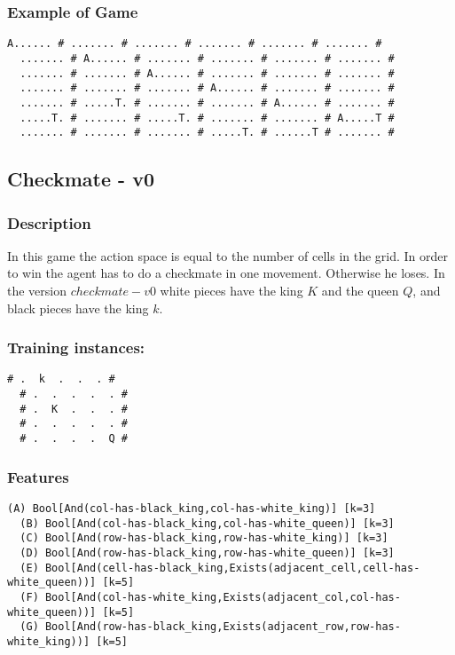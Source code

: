 \documentclass[a4paper]{article}
\begin{document}
\subsubsection{Example of Game}
\begin{Verbatim}[fontsize=\footnotesize]
  A...... # ....... # ....... # ....... # ....... # ....... #
  ....... # A...... # ....... # ....... # ....... # ....... #
  ....... # ....... # A...... # ....... # ....... # ....... #
  ....... # ....... # ....... # A...... # ....... # ....... #
  ....... # .....T. # ....... # ....... # A...... # ....... #
  .....T. # ....... # .....T. # ....... # ....... # A.....T #
  ....... # ....... # ....... # .....T. # ......T # ....... #
\end{Verbatim}

\subsection{Checkmate - v0}
\subsubsection{Description}
In this game the action space is equal to the number of cells in the grid. In order to win the agent has to do a checkmate in one movement. Otherwise he loses. In the version $checkmate-v0$ white pieces have the king $K$ and the queen $Q$, and black pieces have the king $k$.

\subsubsection{Training instances:}
\begin{Verbatim}[fontsize=\footnotesize]
  # .  k  .  .  . #
  # .  .  .  .  . #
  # .  K  .  .  . #
  # .  .  .  .  . #
  # .  .  .  .  Q #
\end{Verbatim}


\subsubsection{Features}
\begin{Verbatim}[fontsize=\footnotesize]
  (A) Bool[And(col-has-black_king,col-has-white_king)] [k=3]
  (B) Bool[And(col-has-black_king,col-has-white_queen)] [k=3]
  (C) Bool[And(row-has-black_king,row-has-white_king)] [k=3]
  (D) Bool[And(row-has-black_king,row-has-white_queen)] [k=3]
  (E) Bool[And(cell-has-black_king,Exists(adjacent_cell,cell-has-white_queen))] [k=5]
  (F) Bool[And(col-has-white_king,Exists(adjacent_col,col-has-white_queen))] [k=5]
  (G) Bool[And(row-has-black_king,Exists(adjacent_row,row-has-white_king))] [k=5]
\end{Verbatim}
\end{document}
